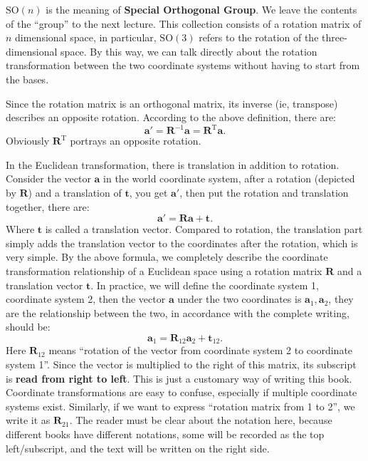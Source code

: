 $\mathrm{SO}(n) $ is the meaning of \textbf {Special Orthogonal Group}. We leave the contents of the ``group'' to the next lecture. This collection consists of a rotation matrix of $ n $ dimensional space, in particular, $\mathrm {SO}(3)$ refers to the rotation of the three-dimensional space. By this way, we can talk directly about the rotation transformation between the two coordinate systems without having to start from the bases.

Since the rotation matrix is an orthogonal matrix, its inverse (ie, transpose) describes an opposite rotation. According to the above definition, there are:
\begin{equation}
\mathbf{a} '= \mathbf{R}^{-1} \mathbf{a} = \mathbf{R}^ \mathrm{T} \mathbf{a}.
\end{equation}
Obviously $ \mathbf{R}^\mathrm{T} $ portrays an opposite rotation.

In the Euclidean transformation, there is translation in addition to rotation. Consider the vector $ \mathbf{a} $ in the world coordinate system, after a rotation (depicted by $ \mathbf{R} $) and a translation of $ \mathbf{t} $, you get $ \mathbf{a}' $, then put the rotation and translation together, there are:
\begin{equation}
\label{eq:RT}
\mathbf{a} '= \mathbf{R} \mathbf{a} + \mathbf{t}.
\end{equation}
Where $ \mathbf{t} $ is called a translation vector. Compared to rotation, the translation part simply adds the translation vector to the coordinates after the rotation, which is very simple. By the above formula, we completely describe the coordinate transformation relationship of a Euclidean space using a rotation matrix $ \mathbf{R} $ and a translation vector $ \mathbf{t}$. In practice, we will define the coordinate system 1, coordinate system 2, then the vector $ \mathbf{a} $ under the two coordinates is $ \mathbf{a}_1, \mathbf{a}_2 $, they are the relationship between the two, in accordance with the complete writing, should be:
\begin{equation}
\mathbf{a}_1 = \mathbf{R}_{12} \mathbf{a}_2 + \mathbf{t}_{12}.
\end{equation}
Here $ \mathbf{R}_{12} $ means ``rotation of the vector from coordinate system 2 to coordinate system 1''. Since the vector is multiplied to the right of this matrix, its subscript is \textbf{read from right to left}. This is just a customary way of writing this book. Coordinate transformations are easy to confuse, especially if multiple coordinate systems exist. Similarly, if we want to express ``rotation matrix from 1 to 2'', we write it as $ \mathbf{R}_{21}$. The reader must be clear about the notation here, because different books have different notations, some will be recorded as the top left/subscript, and the text will be written on the right side.

